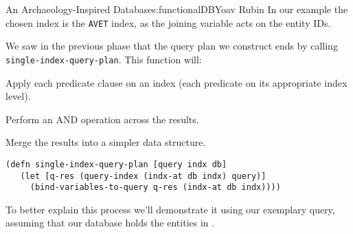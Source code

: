 \begin{aosachapter}{An Archaeology-Inspired Database}{s:functionalDB}{Yoav Rubin}
In our example the chosen index is the \texttt{AVET} index, as the
joining variable acts on the entity IDs.

\label{phase-3-execution-of-the-plan}

We saw in the previous phase that the query plan we construct ends by
calling \texttt{single-index-query-plan}. This function will:

\begin{aosaenumerate}
\def\labelenumi{\arabic{enumi}.}

\item
  Apply each predicate clause on an index (each predicate on its
  appropriate index level).
\item
  Perform an AND operation across the results.
\item
  Merge the results into a simpler data structure.
\end{aosaenumerate}

\begin{verbatim}
(defn single-index-query-plan [query indx db]
   (let [q-res (query-index (indx-at db indx) query)]
     (bind-variables-to-query q-res (indx-at db indx))))
\end{verbatim}

To better explain this process we'll demonstrate it using our exemplary
query, assuming that our database holds the entities in
.


\end{aosachapter}
